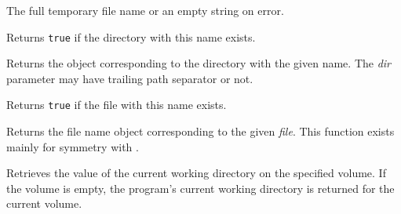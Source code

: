 

The full temporary file name or an empty string on error.


\label{wxfilenamedirexists}



Returns {\tt true} if the directory with this name exists.


\label{wxfilenamedirname}


Returns the object corresponding to the directory with the given name.
The {\it dir} parameter may have trailing path separator or not.



\label{wxfilenamefileexists}



Returns {\tt true} if the file with this name exists.





\label{wxfilenamefilename}


Returns the file name object corresponding to the given {\it file}. This
function exists mainly for symmetry with .



\label{wxfilenamegetcwd}


Retrieves the value of the current working directory on the specified volume. If
the volume is empty, the program's current working directory is returned for the
current volume.

